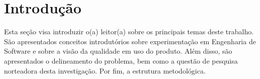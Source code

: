 \chapter{Introdução}   
\label{ch:intro}

Esta seção visa introduzir o(a) leitor(a) sobre os principais temas deste trabalho. São apresentados conceitos introdutórios sobre experimentação em Engenharia de Software e sobre a visão da qualidade em uso do produto. Além disso, são apresentados o delineamento do problema, bem como a questão de pesquisa norteadora desta investigação. Por fim, a estrutura metodológica.













